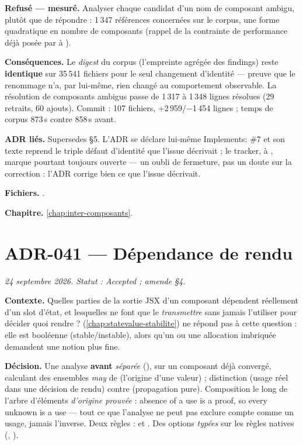 \textbf{Refusé --- mesuré.} Analyser chaque candidat d'un nom de composant
ambigu, plutôt que de répondre  : 1\,347 références
concernées sur le corpus, une forme quadratique en nombre de composants
(rappel de la contrainte de performance déjà posée par  à
).

\textbf{Conséquences.} Le \emph{digest} du corpus (l'empreinte agrégée des
findings) reste \textbf{identique} sur 35\,541 fichiers pour le seul
changement d'identité --- preuve que le renommage n'a, par lui-même, rien
changé au comportement observable. La résolution de composants ambigus passe
de 1\,317 à 1\,348 lignes résolues (29 retraits, 60 ajouts). Commit
 : 107 fichiers, +2\,959/$-$1\,454 lignes ; temps de corpus
873\,s contre 858\,s avant.

\textbf{ADR liés.} Supersedes  §5. L'ADR se déclare lui-même
\og Implements: \#7\fg{} et son texte reprend le triple défaut d'identité
que l'issue décrivait ; le tracker, à \code{\snapshotCommit}, marque pourtant
toujours  ouverte --- un oubli de fermeture, pas un doute sur la
correction : l'ADR corrige bien ce que l'issue décrivait.

\textbf{Fichiers.} .

\textbf{Chapitre.} \cref{chap:inter-composants}.

\section{ADR-041 --- Dépendance de rendu}
\label{adr:41}
\noindent\textit{24 septembre 2026. Statut : Accepted ; amende  §4.}

\textbf{Contexte.} Quelles parties de la sortie JSX d'un composant dépendent
réellement d'un slot d'état, et lesquelles ne font que le \emph{transmettre}
sans jamais l'utiliser pour décider quoi rendre ? 
(\cref{chap:statevalue-stabilite}) ne répond pas à cette question : elle est
booléenne (stable/instable), alors qu'un  ou une allocation
imbriquée demandent une notion plus fine.

\textbf{Décision.} Une analyse \textbf{avant} \emph{séparée}
(), sur un composant déjà convergé, calculant des
ensembles \emph{may} de  (l'origine d'une valeur) ; distinction
 (usage réel dans une décision de rendu) contre 
(propagation pure). Composition le long de l'arbre d'éléments \emph{d'origine
prouvée} : \og absence of a use is a proof, so every unknown is a use\fg{}
--- tout ce que l'analyse ne peut pas exclure compte comme un usage, jamais
l'inverse. Deux règles \Warning{} :  et
. Des options \emph{typées} sur les règles
natives (, ).


